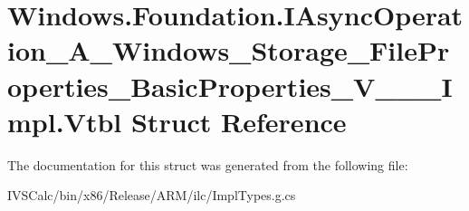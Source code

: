 \hypertarget{struct_windows_1_1_foundation_1_1_i_async_operation___a___windows___storage___file_properties___ee4eb379b203590ff34b9245de298e9a}{}\section{Windows.\+Foundation.\+I\+Async\+Operation\+\_\+\+A\+\_\+\+Windows\+\_\+\+Storage\+\_\+\+File\+Properties\+\_\+\+Basic\+Properties\+\_\+\+V\+\_\+\+\_\+\+\_\+\+Impl.\+Vtbl Struct Reference}
\label{struct_windows_1_1_foundation_1_1_i_async_operation___a___windows___storage___file_properties___ee4eb379b203590ff34b9245de298e9a}


The documentation for this struct was generated from the following file\+:\begin{DoxyCompactItemize}
\item 
I\+V\+S\+Calc/bin/x86/\+Release/\+A\+R\+M/ilc/Impl\+Types.\+g.\+cs\end{DoxyCompactItemize}
